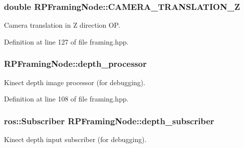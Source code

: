 \hypertarget{class_r_p_framing_node_a6b93f87ce0907cf58a5d24456ab9ccb4}{
\subsubsection[{\-C\-A\-M\-E\-R\-A\-\_\-\-T\-R\-A\-N\-S\-L\-A\-T\-I\-O\-N\-\_\-\-Z}]{\setlength{\rightskip}{0pt plus 5cm}double {\bf \-R\-P\-Framing\-Node\-::\-C\-A\-M\-E\-R\-A\-\_\-\-T\-R\-A\-N\-S\-L\-A\-T\-I\-O\-N\-\_\-\-Z}}}\label{class_r_p_framing_node_a6b93f87ce0907cf58a5d24456ab9ccb4}
\-Camera translation in \-Z direction \-O\-P. 

\-Definition at line 127 of file framing.\-hpp.

\hypertarget{class_r_p_framing_node_a40add69b2b615d2293c8c100606146b6}{
\subsubsection[{depth\-\_\-processor}]{ {\bf \-R\-P\-Framing\-Node\-::depth\-\_\-processor}}}\label{class_r_p_framing_node_a40add69b2b615d2293c8c100606146b6}
\-Kinect depth image processor (for debugging). 

\-Definition at line 108 of file framing.\-hpp.

\hypertarget{class_r_p_framing_node_af473bf98f3e2f4653e5aaaec8a11a726}{
\subsubsection[{depth\-\_\-subscriber}]{\setlength{\rightskip}{0pt plus 5cm}ros\-::\-Subscriber {\bf \-R\-P\-Framing\-Node\-::depth\-\_\-subscriber}}}\label{class_r_p_framing_node_af473bf98f3e2f4653e5aaaec8a11a726}
\-Kinect depth input subscriber (for debugging). 

